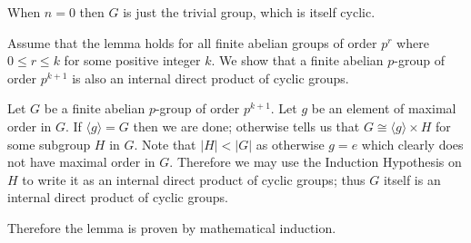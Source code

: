 \begin{questions}
    When $n = 0$ then $G$ is just the trivial group, which is itself cyclic.

    Assume that the lemma holds for all finite abelian groups of order $p^r$ where $0 \leq r \leq k$ for some positive integer $k$. We show that a finite abelian $p$-group of order $p^{k+1}$ is also an internal direct product of cyclic groups.

    Let $G$ be a finite abelian $p$-group of order $p^{k+1}$. Let $g$ be an element of maximal order in $G$. If $\langle g \rangle = G$ then we are done; otherwise  tells us that $G \cong \langle g \rangle \times H$ for some subgroup $H$ in $G$. Note that $|H| < |G|$ as otherwise $g = e$ which clearly does not have maximal order in $G$. Therefore we may use the Induction Hypothesis on $H$ to write it as an internal direct product of cyclic groups; thus $G$ itself is an internal direct product of cyclic groups.

    Therefore the lemma is proven by mathematical induction.
\end{questions}

